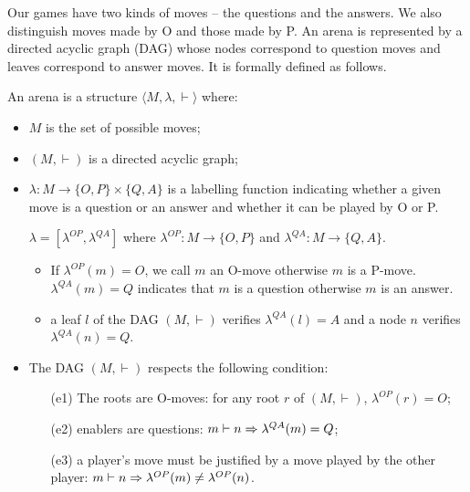 Our games have two kinds of moves -- the questions and the answers.
We also distinguish moves made by O and those made by P. An arena is
represented by a directed acyclic graph (DAG) whose nodes correspond
to question moves and leaves correspond to answer moves. It is
formally defined as follows.
\begin{dfn}[Arena]
An arena is a structure $\langle M, \lambda, \vdash \rangle$ where:
\begin{itemize}
\item $M$ is the set of possible moves;
\item $(M,\vdash)$ is a directed acyclic graph;

\item $\lambda : M \rightarrow \{ O, P\} \times \{Q, A\}$ is a labelling function indicating whether a given move
    is a question or an answer and whether it can be played by O or P.

    $\lambda = [\lambda^{OP},\lambda^{QA}]$ where $\lambda^{OP} : M \rightarrow  \{ O, P\}$
    and $\lambda^{QA} : M \rightarrow  \{ Q, A\}$.

    \begin{itemize}
    \item If $\lambda^{OP} (m) = O$, we call $m$ an O-move otherwise $m$ is a P-move.
    $\lambda^{QA} (m) = Q$ indicates that $m$ is a question otherwise $m$ is an answer.

    \item a leaf $l$ of the DAG $(M,\vdash)$ verifies $\lambda^{QA} (l) = A$ and a node
    $n$ verifies $\lambda^{QA} (n) = Q$.
    \end{itemize}

\item The DAG $(M,\vdash)$ respects the following condition:
    \begin{itemize}
    \item[(e1)] The roots are O-moves: for any root $r$ of $(M,\vdash)$, $\lambda^{OP} (r) =
    O$;
    \item[(e2)] enablers are questions: $m \vdash n  \Rightarrow \lambda^{QA}(m) =
    Q$;
    \item[(e3)] a player's move must be justified by a move played by the other player:
         $m\vdash n \Rightarrow \lambda^{OP}(m) \neq \lambda^{OP}(n)$.
    \end{itemize}
\end{itemize}
\end{dfn}

